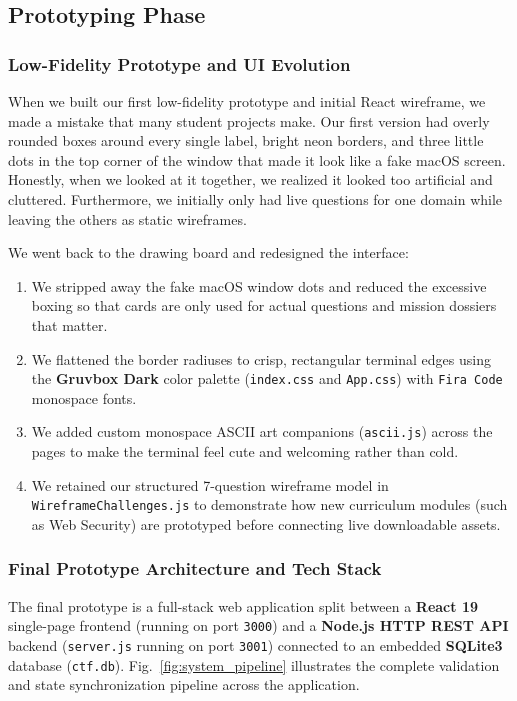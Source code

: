 \documentclass[11pt,a4paper]{article}
\begin{document}
\subsection{Prototyping Phase}

\subsubsection{Low-Fidelity Prototype and UI Evolution}
When we built our first low-fidelity prototype and initial React wireframe, we made a mistake that many student projects make. Our first version had overly rounded boxes around every single label, bright neon borders, and three little dots in the top corner of the window that made it look like a fake macOS screen. Honestly, when we looked at it together, we realized it looked too artificial and cluttered. Furthermore, we initially only had live questions for one domain while leaving the others as static wireframes.

We went back to the drawing board and redesigned the interface:
\begin{enumerate}
    \item We stripped away the fake macOS window dots and reduced the excessive boxing so that cards are only used for actual questions and mission dossiers that matter.
    \item We flattened the border radiuses to crisp, rectangular terminal edges using the \textbf{Gruvbox Dark} color palette (\texttt{index.css} and \texttt{App.css}) with \texttt{Fira Code} monospace fonts.
    \item We added custom monospace ASCII art companions (\texttt{ascii.js}) across the pages to make the terminal feel cute and welcoming rather than cold.
    \item We retained our structured 7-question wireframe model in \texttt{WireframeChallenges.js} to demonstrate how new curriculum modules (such as Web Security) are prototyped before connecting live downloadable assets.
\end{enumerate}

\subsubsection{Final Prototype Architecture and Tech Stack}
The final prototype is a full-stack web application split between a \textbf{React 19} single-page frontend (running on port \texttt{3000}) and a \textbf{Node.js HTTP REST API} backend (\texttt{server.js} running on port \texttt{3001}) connected to an embedded \textbf{SQLite3} database (\texttt{ctf.db}). Fig.~\ref{fig:system_pipeline} illustrates the complete validation and state synchronization pipeline across the application.
\end{document}
